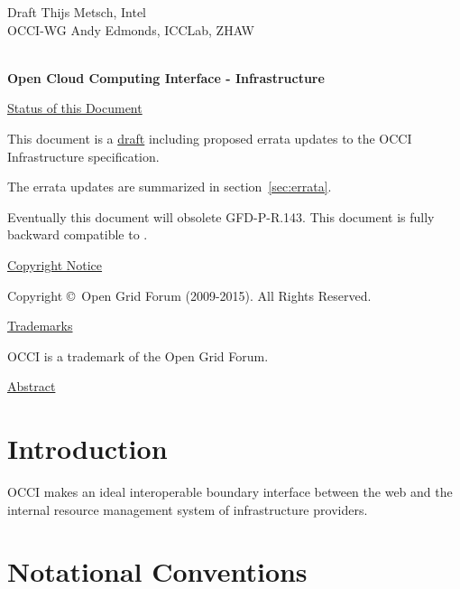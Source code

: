 \documentclass[10pt,a4paper]{article}
\begin{document}
\thispagestyle{empty}

Draft \hfill  Thijs Metsch, Intel\\
OCCI-WG \hfill  Andy Edmonds, ICCLab, ZHAW\\
\\

\vspace*{0.5in}

\begin{Large}
\textbf{Open Cloud Computing Interface - Infrastructure}
\end{Large}

\vspace*{0.5in}

\underline{Status of this Document}

% 

This document is a \underline{draft} including proposed errata updates
to the OCCI Infrastructure \cite{occi:infrastructure} specification.

The errata updates are summarized in section~\ref{sec:errata}.

Eventually this document will obsolete GFD-P-R.143. This document is
fully backward compatible to \cite{occi:infrastructure}.

\underline{Copyright Notice}

Copyright \copyright ~Open Grid Forum (2009-2015). All Rights
Reserved.

\underline{Trademarks}

OCCI is a trademark of the Open Grid Forum.

\underline{Abstract}



\newpage
\tableofcontents
\newpage

\section{Introduction}


OCCI makes an ideal interoperable boundary interface between the web
and the internal resource management system of infrastructure
providers.

\section{Notational Conventions}

\end{document}

